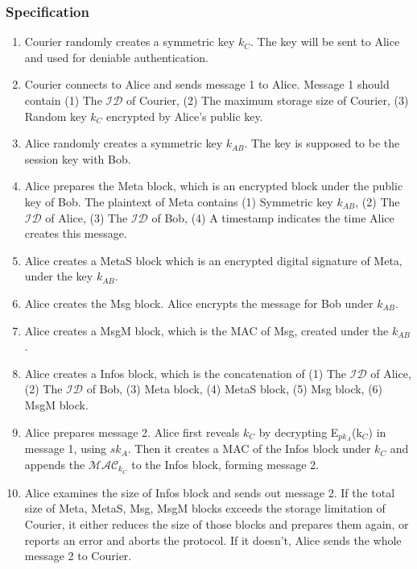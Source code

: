 \subsubsection{Specification}
\begin{enumerate}
\item Courier randomly creates a symmetric key $k_C$. The key will be sent to Alice and used for deniable authentication.

\item Courier connects to Alice and sends message 1 to Alice. Message 1 should contain (1) The $\mathcal{ID}$ of Courier, (2) The maximum storage size of Courier, (3) Random key $k_C$ encrypted by Alice's public key.

\item Alice randomly creates a symmetric key $ k_{AB} $. The key is supposed to be the session key with Bob.

\item Alice prepares the Meta block, which is an encrypted block under the public key of Bob. The plaintext of Meta contains (1) Symmetric key $ k_{AB} $, (2) The $ \mathcal{ID} $ of Alice, (3) The $ \mathcal{ID} $ of Bob, (4) A timestamp indicates the time Alice creates this message.

\item Alice creates a MetaS block which is an encrypted digital signature of Meta, under the key $ k_{AB} $.

\item Alice creates the Msg block. Alice encrypts the message for Bob under $ k_{AB} $.

\item Alice creates a MsgM block, which is the MAC of Msg, created under the $ k_{AB} $.

\item Alice creates a Infos block, which is the concatenation of (1) The $ \mathcal{ID} $ of Alice, (2) The $ \mathcal{ID} $ of Bob, (3) Meta block, (4) MetaS block, (5) Msg block, (6) MsgM block.

\item Alice prepares message 2. Alice first reveals $ k_C $ by decrypting E$_{pk_A}$(k$_C$) in message 1, using $ sk_A $. Then it creates a MAC of the Infos block under $ k_C $ and appends the $ \mathcal{MAC}_{k_C} $ to the Infos block, forming message 2.

\item Alice examines the size of Infos block and sends out message 2. If the total size of Meta, MetaS, Msg, MsgM blocks exceeds the storage limitation of Courier, it either reduces the size of those blocks and prepares them again, or reports an error and aborts the protocol. If it doesn't, Alice sends the whole message 2 to Courier.


\end{enumerate}
